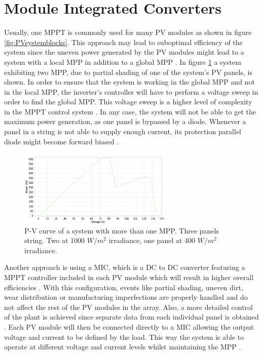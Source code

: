 
\section{Module Integrated Converters}

Usually, one MPPT is commonly used for many PV modules as shown in figure \ref{fig:PVsystemblocks}. This approach may lead to suboptimal efficiency of the system since the uneven power generated by the PV modules might lead to a system with a local MPP in addition to a global MPP \cite{AN1521_MC}. In figure \ref{multiple_local_MPP} a system exhibiting two MPP, due to partial shading of one of the system's PV panels, is shown. In order to ensure that the system is working in the global MPP and not in the local MPP, the inverter's controller will have to perform a voltage sweep in order to find the global MPP. This voltage sweep is a higher level of complexity in the MPPT control system \cite{AN1521_MC}. In any case, the system will not be able to get the maximum power generation, as one panel is bypassed by a diode. Whenever a panel in a string is not able to supply enough current, its protection parallel diode might become  forward biased \cite{ArchitectureMIC}. 
\begin{figure}[H]
	\begin{center}
		\includegraphics[width=0.65\textwidth]{../Pictures/local_MPP_PLECS.png}
		\caption{P-V curve of a system with more than one MPP. Three panels string. Two at 1000 $W/m^2$ irradiance, one panel at 400 $W/m^2$ irradiance.}
		\label{multiple_local_MPP}
	\end{center}	
\end{figure} 

Another approach is using a MIC, which is a DC to DC converter featuring a MPPT controller included in each PV module which will result in higher overall efficiencies \cite{ArchitectureMIC}. With this configuration, events like partial shading, uneven dirt, wear distribution or manufacturing imperfections are properly handled and do not affect the rest of the PV modules in the array. Also, a more detailed control of the plant is achieved since separate data from each individual panel is obtained \cite{ArchitectureMIC}. Each PV module will then be connected directly to a MIC allowing the output voltage and current to be defined by the load. This way the system is able to operate at different voltage and current levels whilst maintaining the MPP \cite{ArchitectureMIC}.

